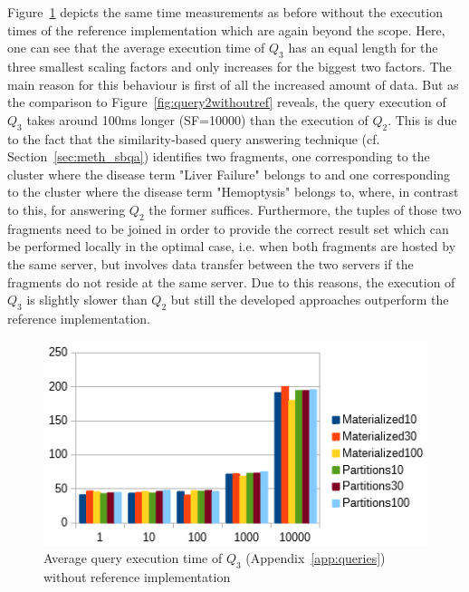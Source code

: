 Figure~\ref{fig:query3withoutref} depicts the same time measurements as before without the execution times of the reference implementation which are again beyond
the scope. Here, one can see that the average execution time of $Q_3$ has an equal length for the three smallest scaling factors and only increases for the
biggest two factors. The main reason for this behaviour is first of all the increased amount of data. But as the comparison to Figure~\ref{fig:query2withoutref}
reveals, the query execution of $Q_3$ takes around 100ms longer (SF=10000) than the execution of $Q_2$. This is due to the fact that the similarity-based query
answering technique (cf. Section~\ref{sec:meth_sbqa}) identifies two fragments, one corresponding to the cluster where the disease term "Liver Failure" belongs
to and one corresponding to the cluster where the disease term "Hemoptysis" belongs to, where, in contrast to this, for answering $Q_2$ the former suffices. 
Furthermore, the tuples of those two fragments need to be joined in order to provide the correct result set which can be performed locally in the optimal case,
i.e. when both fragments are hosted by the same server, but involves data transfer between the two servers if the fragments do not reside at the same server.
Due to this reasons, the execution of $Q_3$ is slightly slower than $Q_2$ but still the developed approaches outperform the reference implementation.
\begin{figure}[h]
    \centering
    \includegraphics[scale=0.9]{charts/Query3WithoutReference.png}
    \caption{Average query execution time of $Q_3$ (Appendix~\ref{app:queries}) without reference implementation}
    \label{fig:query3withoutref}
\end{figure}


